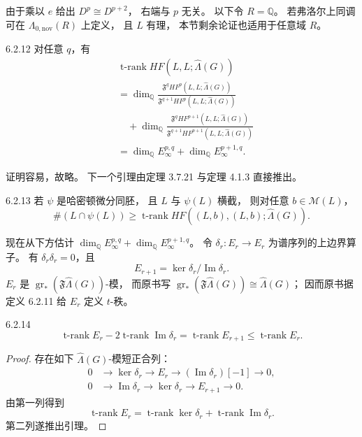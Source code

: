 由于乘以 $e$ 给出
$D^p\cong D^{p+2}$，
右端与 $p$ 无关。
以下令 $R=\mathbb Q$。
若弗洛尔上同调可在
$\Lambda_{0,\mathrm{nov}}(R)$ 上定义，
且 $L$ 有理，
本节剩余论证也适用于任意域 $R$。

\begin{lemma}{6.2.12}\label{lem:6-2-12}
对任意 $q$，有
\[
\begin{aligned}
&\operatorname{t-rank}
HF(L,L;\widehat\Lambda(G))\\
&=\dim_{\mathbb Q}
\frac{\mathfrak F^qHF^p(L,L;\widehat\Lambda(G))}
{\mathfrak F^{q+1}HF^p(L,L;\widehat\Lambda(G))}\\
&\quad+\dim_{\mathbb Q}
\frac{\mathfrak F^qHF^{p+1}(L,L;\widehat\Lambda(G))}
{\mathfrak F^{q+1}HF^{p+1}(L,L;\widehat\Lambda(G))}\\
&=\dim_{\mathbb Q}E_\infty^{p,q}
+\dim_{\mathbb Q}E_\infty^{p+1,q}.
\end{aligned}
\]
\end{lemma}

证明容易，故略。
下一个引理由定理 3.7.21
与定理 4.1.3 直接推出。

\begin{lemma}{6.2.13}\label{lem:6-2-13}
若 $\psi$ 是哈密顿微分同胚，
且 $L$ 与 $\psi(L)$ 横截，
则对任意 $b\in\mathcal M(L)$，
\[
\#(L\cap\psi(L))
\ge
\operatorname{t-rank}
HF((L,b),(L,b);\widehat\Lambda(G)).
\]
\end{lemma}

现在从下方估计
$\dim_{\mathbb Q}E_\infty^{p,q}
+\dim_{\mathbb Q}E_\infty^{p+1,q}$。
令 $\delta_r:E_r\to E_r$
为谱序列的上边界算子。
有 $\delta_r\delta_r=0$，且
\[
E_{r+1}=\ker\delta_r/\operatorname{Im}\delta_r.
\]
$E_r$ 是
$\operatorname{gr}_*(\mathfrak F\widehat\Lambda(G))$-模，
而原书写
$\operatorname{gr}_*(\mathfrak F\widehat\Lambda(G))
\cong\widehat\Lambda(G)$；
因而原书据定义 6.2.11
给 $E_r$ 定义 $t$-秩。

\begin{lemma}{6.2.14}\label{lem:6-2-14}
\[
\operatorname{t-rank}E_r
-2\operatorname{t-rank}
\operatorname{Im}\delta_r
=\operatorname{t-rank}E_{r+1}
\le\operatorname{t-rank}E_r.
\]
\end{lemma}

\begin{proof}
存在如下 $\widehat\Lambda(G)$-模短正合列：
\[
\begin{aligned}
0&\longrightarrow\ker\delta_r
\longrightarrow E_r
\longrightarrow(\operatorname{Im}\delta_r)[-1]
\longrightarrow0,\\
0&\longrightarrow\operatorname{Im}\delta_r
\longrightarrow\ker\delta_r
\longrightarrow E_{r+1}
\longrightarrow0.
\end{aligned}
\]
由第一列得到
\[
\operatorname{t-rank}E_r
=\operatorname{t-rank}\ker\delta_r
+\operatorname{t-rank}\operatorname{Im}\delta_r.
\]
第二列遂推出引理。
\end{proof}

